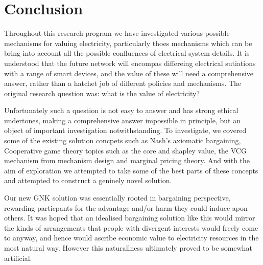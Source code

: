 \chapter{Conclusion}
\label{cha:conc}

Throughout this research program we have investigated various possible mechanisms for valuing electricity, particularly thoes mechanisms which can be bring into account all the possible confluences of electrical system details.
It is understood that the future network will encompas differeing electrical sutiations with a range of smart devices, and the value of these will need a comprehensive answer, rather than a hatchet job of different policies and mechanisms.
The original research question was: what is the value of electricity?

Unfortunately such a question is not easy to answer and has strong ethical undertones, making a comprehensive answer impossible in principle, but an object of important investigation notwithstanding.
To investigate, we covered some of the existing solution concpets such as Nash's axiomatic bargaining, Cooperative game theory topics such as the core and shapley value, the VCG mechanism from mechanism design and marginal pricing theory.
And with the aim of exploration we attempted to take some of the best parts of these concepts and attempted to construct a geninely novel solution.

Our new GNK solution was essentially rooted in bargaining perspective, rewarding particpants for the advantage and/or harm they could induce apon others.
It was hoped that an idealised bargaining solution like this would mirror the kinds of arrangements that people with divergent interests would freely come to anyway, and hence would ascribe economic value to electricity resources in the most natural way.
However this naturallness ultimately proved to be somewhat artificial.


